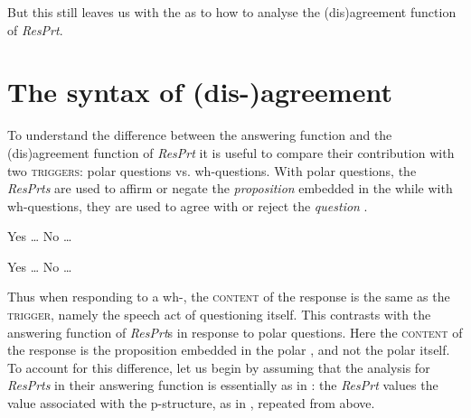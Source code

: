 \documentclass[output=paper]{LSP/langsci}
\begin{document}
But this still leaves us with the  as to how to analyse the (dis)agreement function of \textit{ResPrt}. 

\section{The syntax of (dis-)agreement} \label{sec:wiltschko:4}

To understand the difference between the answering function and the (dis)agreement function of \textit{ResPrt} it is useful to compare their contribution with two \textsc{triggers:} polar questions vs. wh-questions. With polar questions, the \textit{ResPrts} are used to affirm or negate the \textit{proposition}  embedded in the  while with wh-questions, they are used to agree with or reject the \textit{question} . 

\ea\label{ex:wiltschko:53}\settowidth{}
\begin{xlist}
\relax [{y/n...?}]    
\begin{xlisti}
\ex Yes …     
\ex No …      
\end{xlisti}
\end{xlist}
\z

\ea\label{ex:wiltschko:54}\settowidth{}
\begin{xlist}
\relax [{Wh …..?}]    
\begin{xlisti}
\ex Yes …   
\ex No …    
\end{xlisti}
\end{xlist}
\z

Thus when responding to a wh-, the \textsc{content} of the response is the same as the \textsc{trigger}, namely the speech act of questioning itself. 
This contrasts with the answering function of \textit{ResPrt}s in response to polar questions. Here the \textsc{content} of the response is the proposition embedded in the polar , and not the polar  itself.
To account for this difference, let us begin by assuming that the analysis for \textit{ResPrts} in their answering function is essentially as in \citet{holmberg:15}: the \textit{ResPrt} values the  value associated with the p-structure, as in , repeated from  above.
\end{document}
